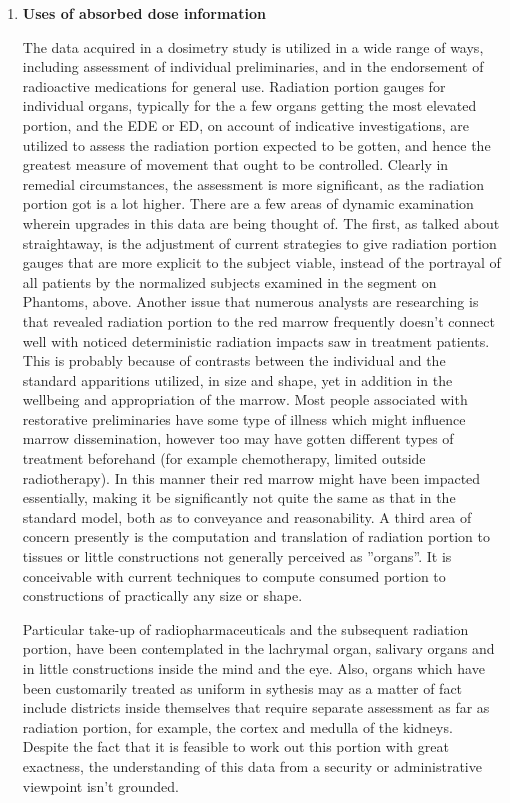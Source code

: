 \documentclass[12pt]{article}
\begin{document}
\begin{enumerate}
\item \textbf{  Uses of absorbed dose information} \par The data acquired in a dosimetry study is utilized in a wide range of ways, including assessment of individual preliminaries, and in the endorsement of radioactive medications for general use. Radiation portion gauges for individual organs, typically for the a few organs getting the most elevated portion, and the EDE or ED, on account of indicative investigations, are utilized to assess the radiation portion expected to be gotten, and hence the greatest measure of movement that ought to be controlled. Clearly in remedial circumstances, the assessment is more significant, as the radiation portion got is a lot higher. There are a few areas of dynamic examination wherein upgrades in this data are being thought of. The first, as talked about straightaway, is the adjustment of current strategies to give radiation portion gauges that are more explicit to the subject viable, instead of the portrayal of all patients by the normalized subjects examined in the segment on Phantoms, above. Another issue that numerous analysts are researching is that revealed radiation portion to the red marrow frequently doesn't connect well with noticed deterministic radiation impacts saw in treatment patients. This is probably because of contrasts between the individual and the standard apparitions utilized, in size and shape, yet in addition in the wellbeing and appropriation of the marrow. Most people associated with restorative preliminaries have some type of illness which might influence marrow dissemination, however too may have gotten different types of treatment beforehand (for example chemotherapy, limited outside radiotherapy). In this manner their red marrow might have been impacted essentially, making it be significantly not quite the same as that in the standard model, both as to conveyance and reasonability. A third area of concern presently is the computation and translation of radiation portion to tissues or little constructions not generally perceived as ''organs''. It is conceivable with current techniques to compute consumed portion to constructions of practically any size or shape.
\par Particular take-up of radiopharmaceuticals and the subsequent radiation portion, have been contemplated in the lachrymal organ, salivary organs and in little constructions inside the mind and the eye. Also, organs which have been customarily treated as uniform in sythesis may as a matter of fact include districts inside themselves that require separate assessment as far as radiation portion, for example, the cortex and medulla of the kidneys. Despite the fact that it is feasible to work out this portion with great exactness, the understanding of this data from a security or administrative viewpoint isn't grounded.
\end{enumerate}
\end{document}
